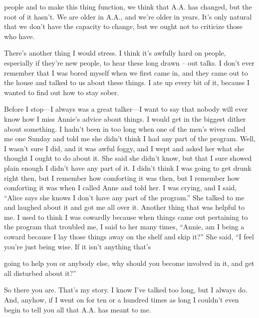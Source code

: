 \begin{biblechapter}
people and to make this thing function, we think that A.A. has changed, but the root of it hasn’t. We are older in A.A., and we’re older in years. It’s only natural that we don’t have the capacity to change, but we ought not to criticize those who have.

There’s another thing I would stress. I think it’s awfully hard on people, especially if they’re new people, to hear these long drawn – out talks. I don’t ever remember that I was bored myself when we first came in, and they came out to the house and talked to us about these things. I ate up every bit of it, because I wanted to find out how to stay sober.

Before I stop—I always was a great talker—I want to say that nobody will ever know how I miss Annie’s advice about things. I would get in the biggest dither about something. I hadn’t been in too long when one of the men’s wives called me one Sunday and told me she didn’t think I had any part of the program. Well, I wasn’t sure I did, and it was awful foggy, and I wept and asked her what she thought I ought to do about it. She said she didn’t know, but that I sure showed plain enough I didn’t have any part of it. I didn’t think I was going to get drunk right then, but I remember how comforting it was then, but I remember how comforting it was when I called Anne and told her. I was crying, and I said, “Alice says she knows I don’t have any part of the program.” She talked to me and laughed about it and got me all over it. Another thing that was helpful to me. I used to think I was cowardly because when things came out pertaining to the program that troubled me, I said to her many times, “Annie, am I being a coward because I lay those things away on the shelf and skip it?” She said, “I feel you’re just being wise. If it isn’t anything that’s

going to help you or anybody else, why should you become involved in it, and get all disturbed about it?”

So there you are. That’s my story. I know I’ve talked too long, but I always do. And, anyhow, if I went on for ten or a hundred times as long I couldn’t even begin to tell you all that A.A. has meant to me.
\end{biblechapter}
